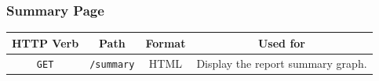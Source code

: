 \documentclass{article}
\begin{document}
\subsubsection{Summary Page}

\begin{center}
\begin{tabular}{|c|c|c|c|}
\hline
HTTP Verb & Path & Format & Used for \\
\hline
\texttt{GET} & \texttt{/summary} & HTML & Display the report summary graph. \\
\hline
\end{tabular}
\end{center}


\begin{center}
\end{center}
\end{document}
